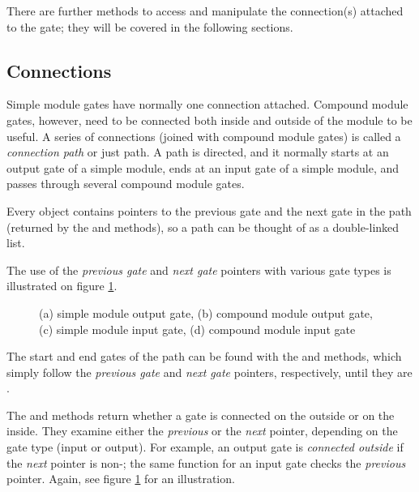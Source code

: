 There are further  methods to access and manipulate
the connection(s) attached to the gate; they will be covered in the
following sections.


\subsection{Connections}
\label{sec:simple-modules:connections}

Simple module gates have normally one connection attached. Compound module
gates, however, need to be connected both inside and outside of the
module to be useful. A series of connections (joined with compound
module gates) is called a \textit{connection path} or just path.
A path is directed, and it normally starts at an output gate of
a simple module, ends at an input gate of a simple module,
and passes through several compound module gates.

Every  object contains pointers to the previous gate
and the next gate in the path (returned by the 
and  methods), so a path can be thought of as
a double-linked list.

The use of the \textit{previous gate} and \textit{next gate} pointers
with various gate types is illustrated on figure
\ref{fig:ch-simple-modules:gates}.

\begin{figure}[htbp]
  \begin{center}
    
    \caption{(a) simple module output gate, (b) compound module output gate,
             (c) simple module input gate, (d) compound module input gate}
    \label{fig:ch-simple-modules:gates}
  \end{center}
\end{figure}

The start and end gates of the path can be found with the 
and  methods, which simply follow the \textit{previous gate} and
\textit{next gate} pointers, respectively, until they are .

The  and  methods
return whether a gate is connected on the outside or on the inside. They
examine either the \textit{previous} or the \textit{next} pointer, depending on the
gate type (input or output). For example, an output gate is \textit{connected outside}
if the \textit{next} pointer is non-; the same function for an input gate
checks the \textit{previous} pointer. Again, see figure \ref{fig:ch-simple-modules:gates}
for an illustration.

